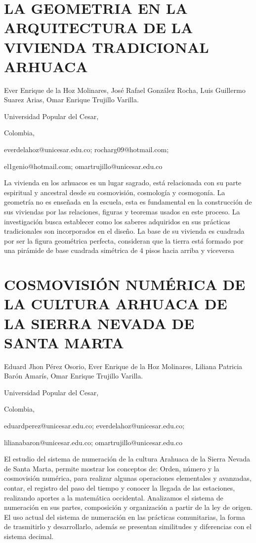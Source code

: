 \section{LA GEOMETRIA EN LA ARQUITECTURA DE LA VIVIENDA TRADICIONAL ARHUACA}

\begin{datos}

Ever Enrique de la Hoz Molinares, José Rafael González Rocha, Luis
Guillermo Suarez Arias, Omar Enrique Trujillo Varilla.

Universidad Popular del Cesar,

Colombia,

everdelahoz@unicesar.edu.co; rocharg09@hotmail.com;

el1genio@hotmail.com; omartrujillo@unicesar.edu.co 

\end{datos}

La vivienda en los arhuacos es un lugar sagrado, está relacionada
con su parte espiritual y ancestral desde su cosmovisión, cosmología
y cosmogonía. La geometría no es enseñada en la escuela, esta es fundamental
en la construcción de sus viviendas por las relaciones, figuras y
teoremas usados en este proceso. La investigación busca establecer
como los saberes adquiridos en sus prácticas tradicionales son incorporados
en el diseño. La base de su vivienda es cuadrada por ser la figura
geométrica perfecta, consideran que la tierra está formado por una
pirámide de base cuadrada simétrica de 4 pisos hacia arriba y viceversa


\section{COSMOVISIÓN NUMÉRICA DE LA CULTURA ARHUACA DE LA SIERRA NEVADA DE
SANTA MARTA}

\begin{datos}

Eduard Jhon Pérez Osorio, Ever Enrique de la Hoz Molinares, Liliana
Patricia Barón Amarís, Omar Enrique Trujillo Varilla.

Universidad Popular del Cesar,

Colombia,

eduardperez@unicesar.edu.co; everdelahoz@unicesar.edu.co;

lilianabaron@unicesar.edu.co; omartrujillo@unicesar.edu.co

\end{datos}

El estudio del sistema de numeración de la cultura Arahuaca de la
Sierra Nevada de Santa Marta, permite mostrar los conceptos de: Orden,
número y la cosmovisión numérica, para realizar algunas operaciones
elementales y avanzadas, contar, el registro del paso del tiempo y
conocer la llegada de las estaciones, realizando aportes a la matemática
occidental. Analizamos el sistema de numeración en sus partes, composición
y organización a partir de la ley de origen. El uso actual del sistema
de numeración en las prácticas comunitarias, la forma de trasmitirlo
y desarrollarlo, además se presentan similitudes y diferencias con
el sistema decimal.


